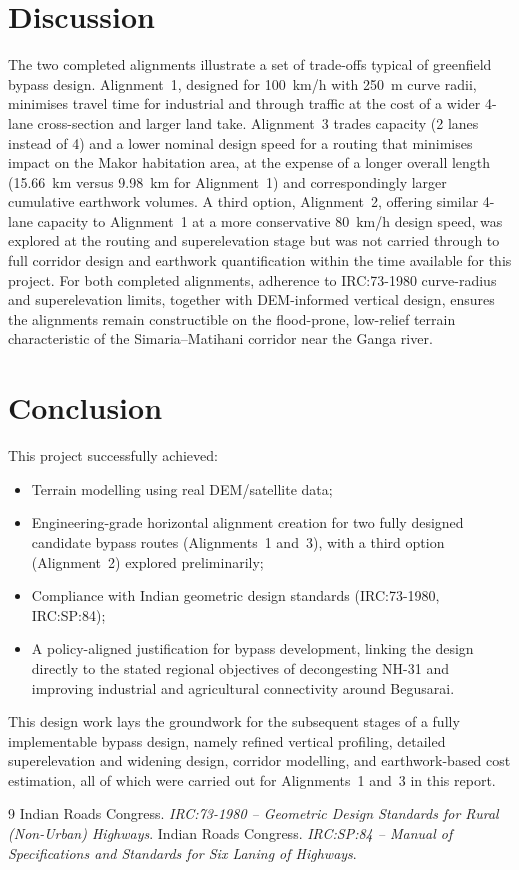 \documentclass[11pt]{article}
\begin{document}
\section{Discussion}
The two completed alignments illustrate a set of trade-offs typical of greenfield bypass design.
Alignment~1, designed for 100~km/h with 250~m curve radii, minimises travel time for industrial and
through traffic at the cost of a wider 4-lane cross-section and larger land take. Alignment~3 trades
capacity (2 lanes instead of 4) and a lower nominal design speed for a routing that minimises impact on
the Makor habitation area, at the expense of a longer overall length (15.66~km versus 9.98~km for
Alignment~1) and correspondingly larger cumulative earthwork volumes. A third option, Alignment~2,
offering similar 4-lane capacity to Alignment~1 at a more conservative 80~km/h design speed, was
explored at the routing and superelevation stage but was not carried through to full corridor design
and earthwork quantification within the time available for this project. For both completed
alignments, adherence to IRC:73-1980 curve-radius and superelevation limits, together with
DEM-informed vertical design, ensures the alignments remain constructible on the flood-prone,
low-relief terrain characteristic of the Simaria--Matihani corridor near the Ganga river.

\section{Conclusion}
This project successfully achieved:
\begin{itemize}
  \item Terrain modelling using real DEM/satellite data;
  \item Engineering-grade horizontal alignment creation for two fully designed candidate bypass routes
  (Alignments~1 and~3), with a third option (Alignment~2) explored preliminarily;
  \item Compliance with Indian geometric design standards (IRC:73-1980, IRC:SP:84);
  \item A policy-aligned justification for bypass development, linking the design directly to the
  stated regional objectives of decongesting NH-31 and improving industrial and agricultural
  connectivity around Begusarai.
\end{itemize}
This design work lays the groundwork for the subsequent stages of a fully implementable bypass design,
namely refined vertical profiling, detailed superelevation and widening design, corridor modelling, and
earthwork-based cost estimation, all of which were carried out for Alignments~1 and~3 in this report.

\begin{thebibliography}{9}
 Indian Roads Congress. \textit{IRC:73-1980 -- Geometric Design Standards for Rural
(Non-Urban) Highways}.
 Indian Roads Congress. \textit{IRC:SP:84 -- Manual of Specifications and Standards
for Six Laning of Highways}.
\end{thebibliography}
\end{document}
